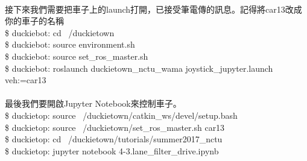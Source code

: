 \documentclass{article}
\begin{document}
\\
接下來我們需要把車子上的launch打開，已接受筆電傳的訊息。記得將car13改成你的車子的名稱
\\\$ duckiebot: cd ~/duckietown
\\\$ duckiebot: source environment.sh
\\\$ duckiebot: source set\_ros\_master.sh
\\\$ duckiebot: roslaunch duckietown\_nctu\_wama joystick\_jupyter.launch veh:=car13
\\\\最後我們要開啟Jupyter Notebook來控制車子。
\\\$ duckietop: source ~/duckietown/catkin\_ws/devel/setup.bash
\\\$ duckietop: source ~/duckietown/set\_ros\_master.sh car13
\\\$ duckietop: cd ~/duckietown/tutorials/summer2017\_nctu
\\\$ duckietop: jupyter notebook 4-3.lane\_filter\_drive.ipynb
\end{document}
